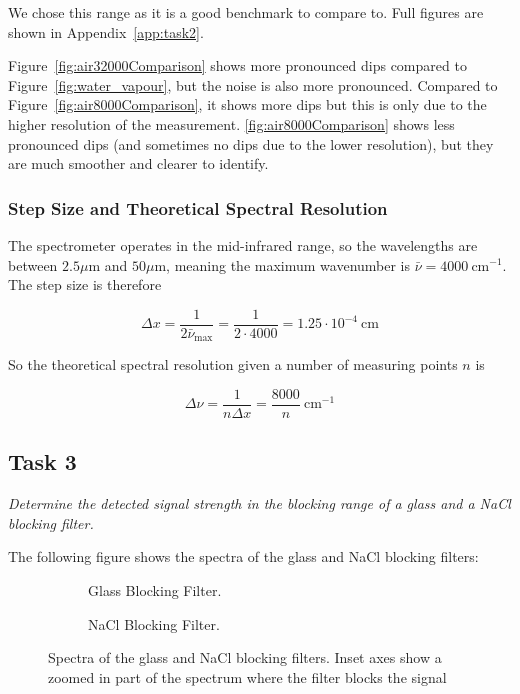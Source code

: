 \documentclass{article}
\begin{document}
We chose this range as it is a good benchmark to compare to. Full figures are shown in Appendix~\ref{app:task2}.

Figure~\ref{fig:air32000Comparison} shows more pronounced dips compared to Figure~\ref{fig:water_vapour}, but the noise is also more pronounced. Compared to Figure~\ref{fig:air8000Comparison}, it shows more dips but this is only due to the higher resolution of the measurement. \ref{fig:air8000Comparison} shows less pronounced dips (and sometimes no dips due to the lower resolution), but they are much smoother and clearer to identify.

\subsubsection{Step Size and Theoretical Spectral Resolution}

The spectrometer operates in the mid-infrared range, so the wavelengths are between $2.5 \mu \text{m}$ and $50  \mu \text{m}$, meaning the maximum wavenumber is $\bar{\nu} = 4000 \ \text{cm}^{-1}$. The step size is therefore

\begin{equation*}
	\Delta x = \frac{1}{2 \bar{\nu}_{\max}} = \frac{1}{2 \cdot 4000} = \boxed{1.25 \cdot 10^{-4} \ \text{cm}}
\end{equation*}

So the theoretical spectral resolution given a number of measuring points $n$ is

\begin{equation*}
	\Delta \nu = \frac{1}{n \Delta x} = \boxed{\frac{8000}{n} \ \text{cm}^{-1}}
\end{equation*}

\pagebreak{}

\subsection{Task 3}

\textit{Determine the detected signal strength in the blocking range of a glass and a NaCl blocking filter.}

The following figure shows the spectra of the glass and NaCl blocking filters:

\begin{figure}[h!]
	\centering
	\begin{subfigure}[t]{0.48\textwidth}
		\centering
		\scalebox{0.5}{}
		\caption{Glass Blocking Filter.}
		\label{fig:glass}
	\end{subfigure} \hfill
	\begin{subfigure}[t]{0.48\textwidth}
		\centering
		\scalebox{0.5}{}
		\caption{NaCl Blocking Filter.}
		\label{fig:nacl}
	\end{subfigure}
	\caption{Spectra of the glass and NaCl blocking filters. Inset axes show a zoomed in part of the spectrum where the filter blocks the signal}
	\label{fig:glass_nacl}
\end{figure}
\end{document}
